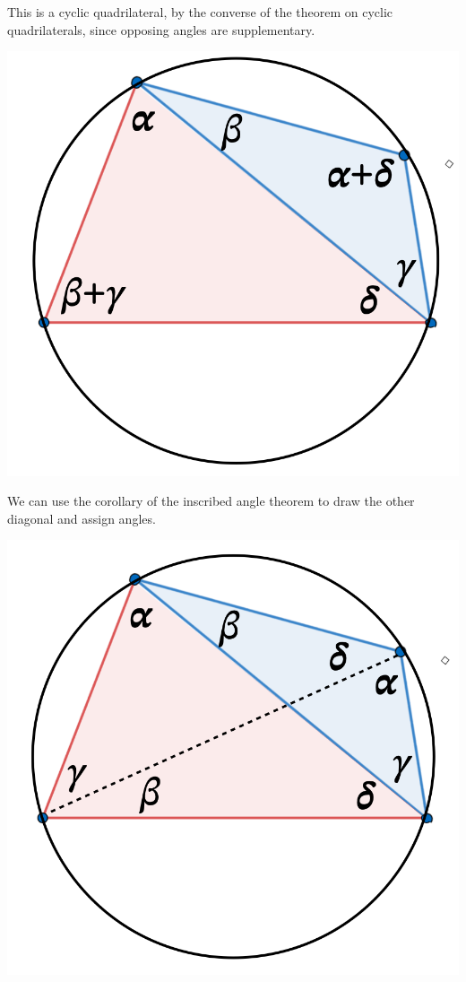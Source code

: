 \documentclass[11pt, oneside]{article}
\begin{document}
This is a cyclic quadrilateral, by the converse of the theorem on cyclic quadrilaterals, since opposing angles are supplementary.
\begin{center} \includegraphics [scale=0.2] {Ptol5.png} \end{center}

We can use the corollary of the inscribed angle theorem to draw the other diagonal and assign angles.
\begin{center} \includegraphics [scale=0.2] {Ptol6.png} \end{center}
\end{document}
